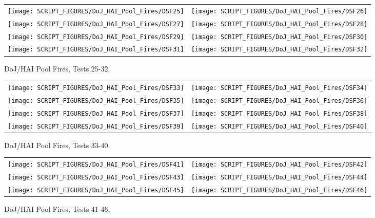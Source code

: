 \begin{figure}[p]
\begin{tabular*}{\textwidth}{l@{\extracolsep{\fill}}r}
\texttt{[image: SCRIPT\_FIGURES/DoJ\_HAI\_Pool\_Fires/DSF25]} &
\texttt{[image: SCRIPT\_FIGURES/DoJ\_HAI\_Pool\_Fires/DSF26]} \\
\texttt{[image: SCRIPT\_FIGURES/DoJ\_HAI\_Pool\_Fires/DSF27]} &
\texttt{[image: SCRIPT\_FIGURES/DoJ\_HAI\_Pool\_Fires/DSF28]} \\
\texttt{[image: SCRIPT\_FIGURES/DoJ\_HAI\_Pool\_Fires/DSF29]} &
\texttt{[image: SCRIPT\_FIGURES/DoJ\_HAI\_Pool\_Fires/DSF30]} \\
\texttt{[image: SCRIPT\_FIGURES/DoJ\_HAI\_Pool\_Fires/DSF31]} &
\texttt{[image: SCRIPT\_FIGURES/DoJ\_HAI\_Pool\_Fires/DSF32]}
\end{tabular*}
\caption[DoJ/HAI Pool Fires, Tests 25-32]{DoJ/HAI Pool Fires, Tests 25-32.}
\label{DoJ_HAI_Pool_Fires_4}
\end{figure}

\begin{figure}[p]
\begin{tabular*}{\textwidth}{l@{\extracolsep{\fill}}r}
\texttt{[image: SCRIPT\_FIGURES/DoJ\_HAI\_Pool\_Fires/DSF33]} &
\texttt{[image: SCRIPT\_FIGURES/DoJ\_HAI\_Pool\_Fires/DSF34]} \\
\texttt{[image: SCRIPT\_FIGURES/DoJ\_HAI\_Pool\_Fires/DSF35]} &
\texttt{[image: SCRIPT\_FIGURES/DoJ\_HAI\_Pool\_Fires/DSF36]} \\
\texttt{[image: SCRIPT\_FIGURES/DoJ\_HAI\_Pool\_Fires/DSF37]} &
\texttt{[image: SCRIPT\_FIGURES/DoJ\_HAI\_Pool\_Fires/DSF38]} \\
\texttt{[image: SCRIPT\_FIGURES/DoJ\_HAI\_Pool\_Fires/DSF39]} &
\texttt{[image: SCRIPT\_FIGURES/DoJ\_HAI\_Pool\_Fires/DSF40]}
\end{tabular*}
\caption[DoJ/HAI Pool Fires, Tests 33-40]{DoJ/HAI Pool Fires, Tests 33-40.}
\label{DoJ_HAI_Pool_Fires_5}
\end{figure}

\begin{figure}[p]
\begin{tabular*}{\textwidth}{l@{\extracolsep{\fill}}r}
\texttt{[image: SCRIPT\_FIGURES/DoJ\_HAI\_Pool\_Fires/DSF41]} &
\texttt{[image: SCRIPT\_FIGURES/DoJ\_HAI\_Pool\_Fires/DSF42]} \\
\texttt{[image: SCRIPT\_FIGURES/DoJ\_HAI\_Pool\_Fires/DSF43]} &
\texttt{[image: SCRIPT\_FIGURES/DoJ\_HAI\_Pool\_Fires/DSF44]} \\
\texttt{[image: SCRIPT\_FIGURES/DoJ\_HAI\_Pool\_Fires/DSF45]} &
\texttt{[image: SCRIPT\_FIGURES/DoJ\_HAI\_Pool\_Fires/DSF46]}
\end{tabular*}
\caption[DoJ/HAI Pool Fires, Tests 41-46]{DoJ/HAI Pool Fires, Tests 41-46.}
\label{DoJ_HAI_Pool_Fires_6}
\end{figure}


